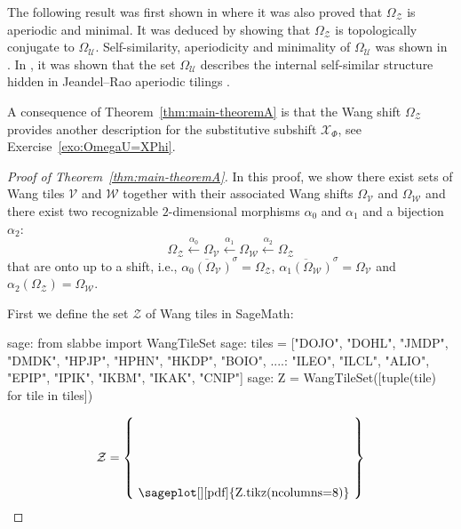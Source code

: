\documentclass[12pt]{amsart}
\newcommand{\Ucal}{\mathcal{U}}
\newcommand{\Vcal}{\mathcal{V}}
\newcommand{\Wcal}{\mathcal{W}}
\newcommand{\Xcal}{\mathcal{X}} %
\newcommand{\Zcal}{\mathcal{Z}}
\newcommand{\shiftclosure}[1]{{\overline{#1}^{\sigma}}}
\begin{document}
The following result was first shown in 
\cite{lepsova_thesis_2024} where it was also proved that
$\Omega_\Zcal$ is aperiodic and minimal.
It was deduced by showing that $\Omega_\Zcal$ is topologically
conjugate to $\Omega_\Ucal$.
Self-similarity, aperiodicity and minimality of $\Omega_\Ucal$
was shown in \cite{MR3978536}.
In \cite{MR4226493}, it was shown that the set
$\Omega_\Ucal$ describes the internal self-similar structure hidden in
Jeandel--Rao aperiodic tilings \cite{MR4210631}.

A consequence of Theorem~\ref{thm:main-theoremA} is that the Wang
shift $\Omega_\Zcal$ provides another description for the substitutive subshift
$\Xcal_\Phi$, see Exercise~\ref{exo:OmegaU=XPhi}.


\begin{proof}[Proof of Theorem~\ref{thm:main-theoremA}]
    In this proof, we show there exist sets of Wang tiles 
$\Vcal$ and $\Wcal$
together with their associated Wang shifts 
$\Omega_\Vcal$ and $\Omega_\Wcal$
and there exist two recognizable $2$-dimensional morphisms $\alpha_0$ and $\alpha_1$
and a bijection $\alpha_2$:
    \begin{equation*}
        \Omega_\Zcal \xleftarrow{\alpha_0}
        \Omega_\Vcal \xleftarrow{\alpha_1}
        \Omega_\Wcal \xleftarrow{\alpha_2}
        \Omega_\Zcal
    \end{equation*}
    that are onto up to a shift, i.e.,
    $\shiftclosure{\alpha_0(\Omega_\Vcal)}=\Omega_\Zcal$,
    $\shiftclosure{\alpha_1(\Omega_\Wcal)}=\Omega_\Vcal$ and
    $\alpha_2(\Omega_\Zcal)=\Omega_\Wcal$.

    First we define the set $\Zcal$ of Wang tiles in SageMath:
\begin{sagecommandlinetcb}
\begin{sagecommandline}
sage: from slabbe import WangTileSet
sage: tiles = ["DOJO", "DOHL", "JMDP", "DMDK", "HPJP", "HPHN", "HKDP", "BOIO", 
....:   "ILEO", "ILCL", "ALIO", "EPIP", "IPIK", "IKBM", "IKAK", "CNIP"]
sage: Z = WangTileSet([tuple(tile) for tile in tiles])
\end{sagecommandline}
\end{sagecommandlinetcb}
\[
\Zcal = \left\{\raisebox{-10mm}{
    \sageplot[][pdf]{Z.tikz(ncolumns=8)}
}\right\}
\]


\end{proof}
\end{document}
